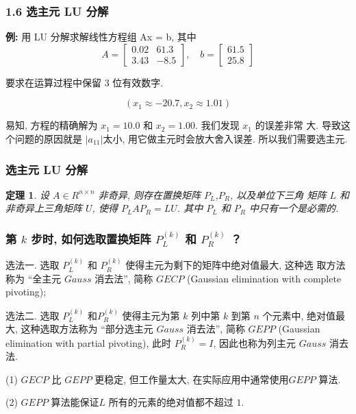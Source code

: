 \documentclass[notheorems,serif]{beamer}
\newcommand{\hei}[1]{{\HEI#1}}
\newtheorem{theorem}{\hei{定理}}
\begin{document}
\begin{frame}
\frametitle{1.6 \quad 选主元 LU 分解}

\textbf{例:} \quad 用 LU 分解求解线性方程组 Ax = b, 其中
\begin{equation}
A=\left[\begin{array}{cc}{0.02} & {61.3} \\ {3.43} & {-8.5}\end{array}\right], \quad b=\left[\begin{array}{c}{61.5} \\ {25.8}\end{array}\right]
\end{equation}

要求在运算过程中保留 3 位有效数字.	

$$(x_1 ≈ −20.7, x_2 ≈ 1.01)$$


易知, 方程的精确解为 $x_1 = 10.0$ 和 $x_2 = 1.00$. 我们发现 $x_1$ 的误差非常
大. 导致这个问题的原因就是 $|a_{11}| $太小, 用它做主元时会放大舍入误差.
所以我们需要选主元.

\end{frame}

\begin{frame}
\frametitle{选主元 LU 分解}
\begin{theorem}
	设 $A ∈ R^{n×n}$ 非奇异, 则存在置换矩阵 $P_L$,$ P_R$, 以及单位下三角
	矩阵 $L$ 和非奇异上三角矩阵 $U$, 使得 $P_LAP_R = LU$. 其中 $P_L$ 和 $P_R$ 中只有一个是必需的.
\end{theorem}

\end{frame}

\begin{frame}
\frametitle{第 $k$ 步时, 如何选取置换矩阵 $P^{(k)}_L$ 和 $P^{(k)}_R$ ？}
选法一. 选取 $P^{(k)}_L$ 和 $P^{(k)}_R$ 使得主元为剩下的矩阵中绝对值最大, 这种选
取方法称为 “全主元 $Gauss$ 消去法”, 简称 $GECP$ (Gaussian elimination
with complete pivoting);

选法二. 选取 $P^{(k)}_L$ 和$ P^{(k)}_R$ 使得主元为第 $k$ 列中第 $k$ 到第 $n$ 个元素中, 绝对值最大, 这种选取方法称为 “部分选主元 $Gauss$ 消去法”, 简称 $GEPP$
(Gaussian elimination with partial pivoting), 此时 $P^{(k)}_R = I$, 因此也称为列主元 $Gauss$ 消去法.


{\red{$\dagger$}}(1) $GECP$ 比 $GEPP$ 更稳定, 但工作量太大, 在实际应用中通常使用$GEPP$ 算法.

\quad(2) $GEPP$ 算法能保证$L$ 所有的元素的绝对值都不超过 $1$.
\end{frame}
\end{document}
